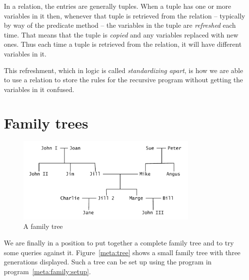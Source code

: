 In a  relation, the entries are generally tuples. When a tuple has one or more variables in it then, whenever that tuple is retrieved from the  relation -- typically by way of the  predicate method -- the variables in the tuple are \emph{refreshed} each time. That means that the tuple is \emph{copied} and any variables replaced with new ones. Thus each time a tuple is retrieved from the  relation, it will have different variables in it. 

This refreshment, which in logic is called \emph{standardizing apart}, is how we are able to use a  relation to store the rules for the recursive  program without getting the variables in it confused.

\section{Family trees}
\label{meta:family:tree}

\begin{figure}[bt]
\centerline{\includegraphics[width=0.8\textwidth]{familytree}}
\caption{\label{meta:tree}A family tree}
\end{figure}

We are finally in a position to put together a complete family tree and to try some queries against it. Figure~\vref{meta:tree} shows a small family tree with three generations displayed. Such a tree can be set up using the program  in program~\vref{meta:family:setup}.


